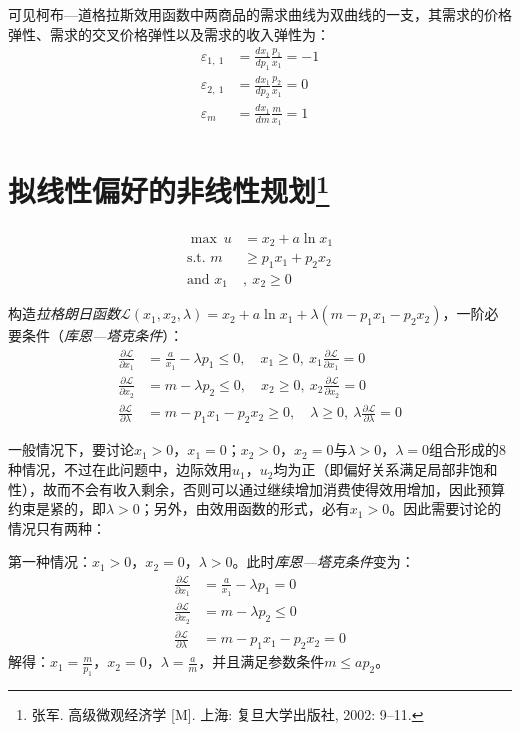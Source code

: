 可见柯布—道格拉斯效用函数中两商品的需求曲线为双曲线的一支，其需求的价格弹性、需求的交叉价格弹性以及需求的收入弹性为：
\begin{align}
\varepsilon_{1,~1} &= \frac{dx_1}{dp_1}\frac{p_1}{x_1} = -1\\
\varepsilon_{2,~1} &= \frac{dx_1}{dp_2}\frac{p_2}{x_1} = 0\\
\varepsilon_{m}    &= \frac{dx_1}{dm}\frac{m}{x_1} = 1
\end{align}

\section{拟线性偏好的非线性规划\footnote{%
张军. 高级微观经济学 [M]. 上海: 复旦大学出版社, 2002: 9--11.}}
\begin{equation}
\begin{split}
        \max~u &= x_2 + a \ln x_1\\
\text{s.t.~} m &\ge p_1 x_1 + p_2 x_2\\
\text{and~} x_1&{,~}x_2 \ge 0
\end{split}
\end{equation}

构造\emph{拉格朗日函数}$\mathcal{L}(x_1, x_2, \lambda)=x_2 + a \ln x_1 + \lambda (m - p_1 x_1 -p_2 x_2)$，一阶必要条件（\emph{库恩—塔克条件}）：
\begin{equation}
\begin{split}
\frac{\partial \mathcal{L}}{\partial x_1} &= \frac{a}{x_1} - \lambda p_1 \le 0, \quad x_1 \ge 0,~x_1 \frac{\partial \mathcal{L}}{\partial x_1} = 0\\
\frac{\partial \mathcal{L}}{\partial x_2} &= m - \lambda p_2 \le 0, \quad x_2 \ge 0,~x_2 \frac{\partial \mathcal{L}}{\partial x_2} = 0\\
\frac{\partial \mathcal{L}}{\partial \lambda} &= m - p_1 x_1 - p_2 x_2 \ge 0, \quad \lambda \ge 0,~\lambda \frac{\partial \mathcal{L}}{\partial \lambda} = 0
\end{split}
\end{equation}

一般情况下，要讨论$x_1 > 0$，$x_1=0$；$x_2 > 0$，$x_2 = 0$与$\lambda > 0$，$\lambda = 0$组合形成的8种情况，不过在此问题中，边际效用$u_1$，$u_2$均为正（即偏好关系满足局部非饱和性），故而不会有收入剩余，否则可以通过继续增加消费使得效用增加，因此预算约束是紧的，即$\lambda > 0$；另外，由效用函数的形式，必有$x_1 > 0$。因此需要讨论的情况只有两种：

第一种情况：$x_1 > 0$，$x_2 = 0$，$\lambda > 0$。此时\emph{库恩—塔克条件}变为：
\begin{equation}
\begin{split}
\frac{\partial \mathcal{L}}{\partial x_1} &= \frac{a}{x_1} - \lambda p_1 = 0\\
\frac{\partial \mathcal{L}}{\partial x_2} &= m - \lambda p_2 \le 0\\
\frac{\partial \mathcal{L}}{\partial \lambda} &= m - p_1 x_1 - p_2 x_2 = 0
\end{split}
\end{equation}
解得：$x_1 = \frac{m}{p_1}$，$x_2 = 0$，$\lambda = \frac{a}{m}$，并且满足参数条件$m \le ap_2$。


